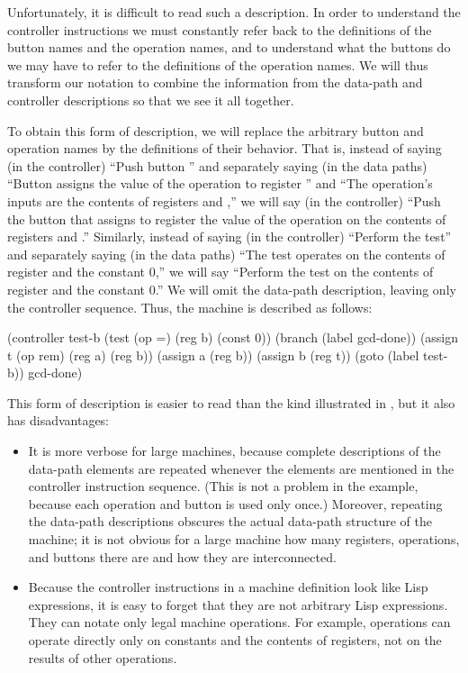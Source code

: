 Unfortunately, it is difficult to read such a description.  In order to
understand the controller instructions we must constantly refer back to the
definitions of the button names and the operation names, and to understand what
the buttons do we may have to refer to the definitions of the operation names.
We will thus transform our notation to combine the information from the
data-path and controller descriptions so that we see it all together.

To obtain this form of description, we will replace the arbitrary button and
operation names by the definitions of their behavior.  That is, instead of
saying (in the controller) ``Push button '' and separately saying
(in the data paths) ``Button  assigns the value of the 
operation to register '' and ``The  operation's inputs are
the contents of registers  and ,'' we will say (in the
controller) ``Push the button that assigns to register  the value of
the  operation on the contents of registers  and .''
Similarly, instead of saying (in the controller) ``Perform the \code{=} test''
and separately saying (in the data paths) ``The \code{=} test operates on the
contents of register  and the constant 0,'' we will say ``Perform the
\code{=} test on the contents of register  and the constant 0.''  We
will omit the data-path description, leaving only the controller sequence.
Thus, the  machine is described as follows:

\begin{codeBlock}
(controller
 test-b
   (test (op =) (reg b) (const 0))
   (branch (label gcd-done))
   (assign t (op rem) (reg a) (reg b))
   (assign a (reg b))
   (assign b (reg t))
   (goto (label test-b))
 gcd-done)
\end{codeBlock}

\noindent
This form of description is easier to read than the kind illustrated in
, but it also has disadvantages:

\begin{itemize}
\item
It is more verbose for large machines, because complete descriptions of the
data-path elements are repeated whenever the elements are mentioned in the
controller instruction sequence.  (This is not a problem in the 
example, because each operation and button is used only once.)  Moreover,
repeating the data-path descriptions obscures the actual data-path structure of
the machine; it is not obvious for a large machine how many registers,
operations, and buttons there are and how they are interconnected.

\item
Because the controller instructions in a machine definition look like Lisp
expressions, it is easy to forget that they are not arbitrary Lisp expressions.
They can notate only legal machine operations.  For example, operations can
operate directly only on constants and the contents of registers, not on the
results of other operations.
\end{itemize}

